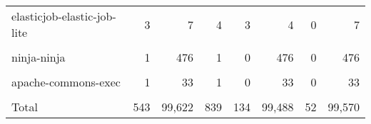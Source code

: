 \begin{table}[t]
\begin{tabular}{l|r|rr|rr|rr}
elasticjob-elastic-job-lite&3&7&4&3&4&0&7\\
\cellcolor{gray!6}{assertj-core}&\cellcolor{gray!6}{1}&\cellcolor{gray!6}{974}&\cellcolor{gray!6}{1}&\cellcolor{gray!6}{0}&\cellcolor{gray!6}{974}&\cellcolor{gray!6}{0}&\cellcolor{gray!6}{974}\\
ninja-ninja&1&476&1&0&476&0&476\\
\cellcolor{gray!6}{handlebars.java}&\cellcolor{gray!6}{1}&\cellcolor{gray!6}{411}&\cellcolor{gray!6}{1}&\cellcolor{gray!6}{0}&\cellcolor{gray!6}{411}&\cellcolor{gray!6}{0}&\cellcolor{gray!6}{411}\\
apache-commons-exec&1&33&1&0&33&0&33\\
\cellcolor{gray!6}{zxing-zxing}&\cellcolor{gray!6}{1}&\cellcolor{gray!6}{322}&\cellcolor{gray!6}{1}&\cellcolor{gray!6}{0}&\cellcolor{gray!6}{322}&\cellcolor{gray!6}{0}&\cellcolor{gray!6}{322}\\
\midrule
Total&543&99,622&839&134&99,488&52&99,570\\





\end{tabular}
\end{table}
